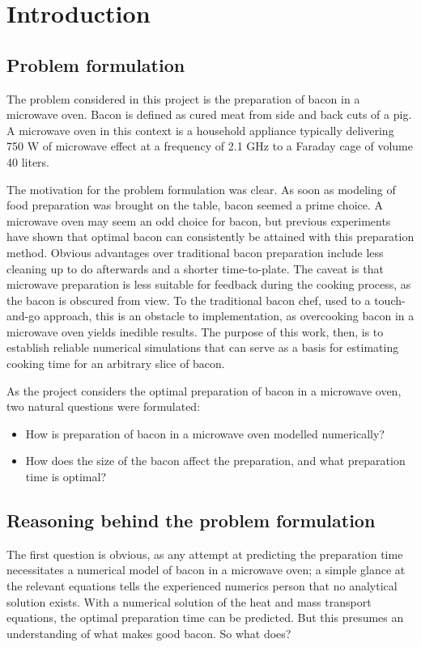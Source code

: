 \chapter{Introduction}
\setcounter{secnumdepth}{1}

\section{Problem formulation}
The problem considered in this project is the preparation of bacon in a microwave oven. Bacon is
defined as cured meat from side and back cuts of a pig. A microwave oven in this context is a
household appliance typically delivering 750 W of microwave effect at a frequency of 2.1 GHz
to a Faraday cage of volume 40 liters. 

The motivation for the problem formulation was clear. As soon as modeling of food preparation was
brought on the table, bacon seemed a prime choice. A microwave oven may seem an odd choice for
bacon, but previous experiments have shown that optimal bacon can consistently be attained with this
preparation method. Obvious advantages over traditional bacon preparation include less cleaning up
to do afterwards and a shorter time-to-plate. The caveat is that microwave preparation is less
suitable for feedback during the cooking process, as the bacon is obscured from view. To the
traditional bacon chef, used to a touch-and-go approach, this is an obstacle to implementation, as
overcooking bacon in a microwave oven yields inedible results. The
purpose of this work, then, is to establish reliable numerical simulations that can serve as a basis
for estimating cooking time for an arbitrary slice of bacon.

As the project considers the optimal preparation of bacon in a microwave oven, two natural questions
were formulated:

\begin{itemize}
  \item How is preparation of bacon in a microwave oven modelled numerically?
  \item How does the size of the bacon affect the preparation, and what preparation time is optimal?
\end{itemize}

\section{Reasoning behind the problem formulation}
The first question is obvious, as any attempt at predicting the preparation time necessitates a
numerical model of bacon in a microwave oven; a simple glance at the relevant
equations tells the experienced numerics person that no analytical solution
exists. With a numerical solution of the heat and mass transport equations, the
optimal preparation time can be predicted. But this presumes an understanding of
what makes good bacon. So what does?

